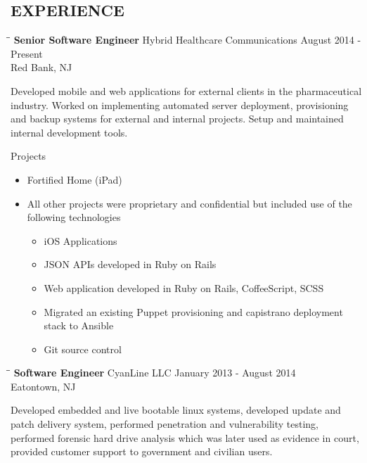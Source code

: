 \documentclass{res}
\begin{document}
\begin{resume}
\section{EXPERIENCE}
   \begin{tabbing}
   \hspace{2.3in}\= \hspace{2.6in}\= \kill %
    {\bf Senior Software Engineer} \>Hybrid Healthcare Communications     \>August 2014 - Present\\
                             \>Red Bank, NJ
   \end{tabbing}\vspace{-20pt}      %
    Developed mobile and web applications for external clients in the pharmaceutical industry.
    Worked on implementing automated server deployment, provisioning and backup systems for external and internal projects.
    Setup and maintained internal development tools.

    Projects
    \begin{itemize}
        \item Fortified Home (iPad)
        \item All other projects were proprietary and confidential but included use of the following technologies
        \begin{itemize}
            \item iOS Applications
            \item JSON APIs developed in Ruby on Rails
            \item Web application developed in Ruby on Rails, CoffeeScript, SCSS
            \item Migrated an existing Puppet provisioning and capistrano deployment stack to Ansible
            \item Git source control
        \end{itemize}
    \end{itemize}

   \begin{tabbing}
   \hspace{2.3in}\= \hspace{2.6in}\= \kill %
    {\bf Software Engineer} \>CyanLine LLC     \>January 2013 - August 2014\\
                             \>Eatontown, NJ
   \end{tabbing}\vspace{-20pt}      %
    Developed embedded and live bootable linux systems, 
    developed update and patch delivery system,
    performed penetration and vulnerability testing,
    performed forensic hard drive analysis which was later used as evidence in court,
    provided customer support to government and civilian users.


\end{resume}
\end{document}
